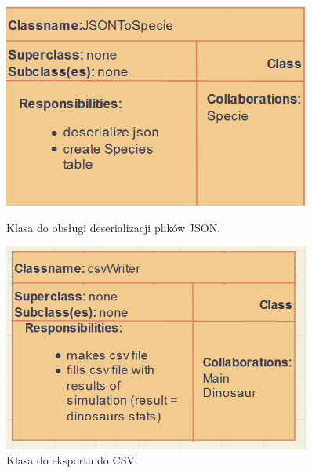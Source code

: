 \newpage

\begin{figure}[h!]
    \centering
    \begin{minipage}{0.45\textwidth}
        \centering
        \includegraphics[width=0.9\textwidth]{images/crc/crc_json} %
        \caption{Klasa do obsługi deserializacji plików JSON.}
    \end{minipage}\hfill
    \begin{minipage}{0.45\textwidth}
        \centering
        \includegraphics[width=0.9\textwidth]{images/crc/csv_crc.png} %
        \caption{Klasa do eksportu do CSV.}
    \end{minipage}
\end{figure}

